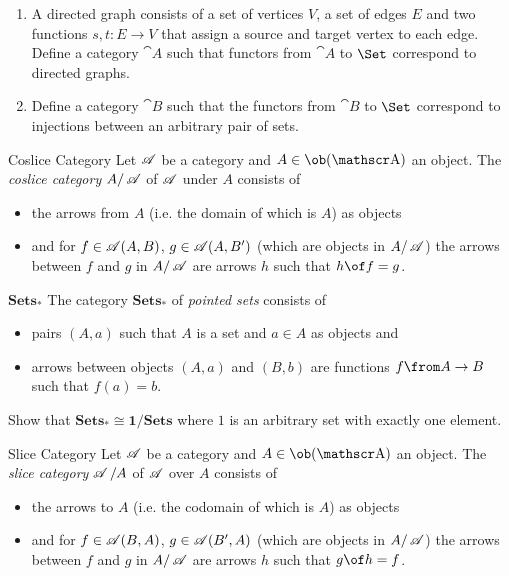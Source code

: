 \begin{exercise}
  \begin{enumerate}
    \item A directed graph consists of a set of vertices $V$, a set of edges $E$ and two functions $s, t : E \to V$ that assign a source and target vertex to each edge.
      Define a category $\cat{A}$ such that functors from $\cat{A}$ to $\Set$ correspond to directed graphs.
    \item Define a category $\cat{B}$ such that the functors from $\cat{B}$ to $\Set$ correspond to injections between an arbitrary pair of sets.
  \end{enumerate}
\end{exercise}


\begin{definition}{Coslice Category}
  Let $\operatorname{\mathscr A}$ be a category and $A\in\ob(\A)$ an object. The \emph{coslice category} $A/\operatorname{\mathscr A}$ of $\operatorname{\mathscr A}$ under $A$ consists of
  \begin{itemize}
  \item the arrows from $A$ (i.e. the domain of which is $A$) as objects
  \item and for $f\in \operatorname{\mathscr A}(A,B)$, $g\in\operatorname{\mathscr A}(A,B')$ (which are objects in $A/\operatorname{\mathscr A}$) the arrows between $f$ and $g$ in $A/\operatorname{\mathscr A}$ are arrows $h$ such that $h\of f=g$.
  \end{itemize}
\end{definition}

\begin{definition}{$\mathbf{Sets_*}$}
  The category $\mathbf{Sets_*}$ of \emph{pointed sets} consists of
  \begin{itemize}
  \item pairs $(A,a)$ such that $A$ is a set and $a\in A$ as objects and
  \item arrows between objects $(A,a)$ and $(B,b)$ are functions $f\from A\to B$ such that $f(a)=b$.
  \end{itemize}
\end{definition}

\begin{exercise}
Show that $\mathbf{Sets_*\cong 1/\mathbf{Sets}}$ where $1$ is an arbitrary set with exactly one element.  
\end{exercise}

\begin{definition}{Slice Category}
  Let $\operatorname{\mathscr A}$ be a category and $A\in\ob(\A)$ an object. The \emph{slice category} $\operatorname{\mathscr A}/A$ of $\operatorname{\mathscr A}$ over $A$ consists of
  \begin{itemize}
  \item the arrows to $A$ (i.e. the codomain of which is $A$) as objects
  \item and for $f\in \operatorname{\mathscr A}(B,A)$, $g\in\operatorname{\mathscr A}(B',A)$ (which are objects in $A/\operatorname{\mathscr A}$) the arrows between $f$ and $g$ in $A/\operatorname{\mathscr A}$ are arrows $h$ such that $g\of h=f$.
  \end{itemize}
\end{definition}

